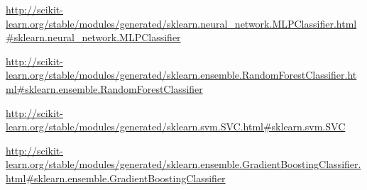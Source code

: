 \documentclass[12pt]{report}
\begin{document}
\begin{sloppypar}
 \url{http://scikit-learn.org/stable/modules/generated/sklearn.neural_network.MLPClassifier.html#sklearn.neural_network.MLPClassifier}
\newline
\noindent


 \url{http://scikit-learn.org/stable/modules/generated/sklearn.ensemble.RandomForestClassifier.html#sklearn.ensemble.RandomForestClassifier}
\newline
\noindent


 \url{http://scikit-learn.org/stable/modules/generated/sklearn.svm.SVC.html#sklearn.svm.SVC}
\newline
\noindent


 \url{http://scikit-learn.org/stable/modules/generated/sklearn.ensemble.GradientBoostingClassifier.html#sklearn.ensemble.GradientBoostingClassifier}

\end{sloppypar}
\end{document}
